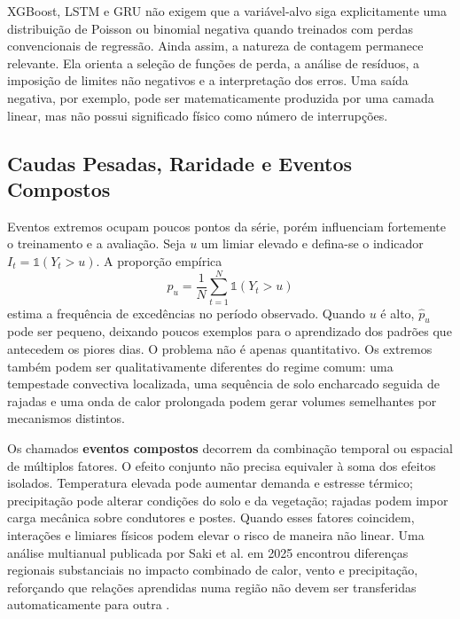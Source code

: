 XGBoost, LSTM e GRU não exigem que a variável-alvo siga explicitamente uma distribuição de Poisson ou binomial negativa quando treinados com perdas convencionais de regressão. Ainda assim, a natureza de contagem permanece relevante. Ela orienta a seleção de funções de perda, a análise de resíduos, a imposição de limites não negativos e a interpretação dos erros. Uma saída negativa, por exemplo, pode ser matematicamente produzida por uma camada linear, mas não possui significado físico como número de interrupções.

\subsection{Caudas Pesadas, Raridade e Eventos Compostos}

Eventos extremos ocupam poucos pontos da série, porém influenciam fortemente o treinamento e a avaliação. Seja $u$ um limiar elevado e defina-se o indicador $I_t=\mathbb{1}(Y_t>u)$. A proporção empírica
\begin{equation}
    \widehat{p}_u=\frac{1}{N}\sum_{t=1}^{N}\mathbb{1}(Y_t>u)
    \label{eq:prob_excedencia}
\end{equation}
estima a frequência de excedências no período observado. Quando $u$ é alto, $\widehat{p}_u$ pode ser pequeno, deixando poucos exemplos para o aprendizado dos padrões que antecedem os piores dias. O problema não é apenas quantitativo. Os extremos também podem ser qualitativamente diferentes do regime comum: uma tempestade convectiva localizada, uma sequência de solo encharcado seguida de rajadas e uma onda de calor prolongada podem gerar volumes semelhantes por mecanismos distintos.

Os chamados \textbf{eventos compostos} decorrem da combinação temporal ou espacial de múltiplos fatores. O efeito conjunto não precisa equivaler à soma dos efeitos isolados. Temperatura elevada pode aumentar demanda e estresse térmico; precipitação pode alterar condições do solo e da vegetação; rajadas podem impor carga mecânica sobre condutores e postes. Quando esses fatores coincidem, interações e limiares físicos podem elevar o risco de maneira não linear. Uma análise multianual publicada por Saki et al. em 2025 encontrou diferenças regionais substanciais no impacto combinado de calor, vento e precipitação, reforçando que relações aprendidas numa região não devem ser transferidas automaticamente para outra \cite{saki2025compound}.


